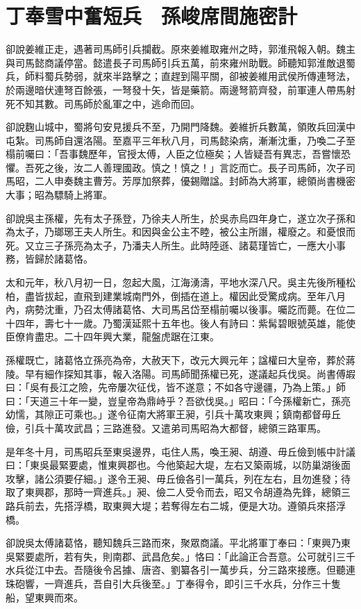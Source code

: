
\chapter{丁奉雪中奮短兵　孫峻席間施密計}

卻說姜維正走，遇著司馬師引兵攔截。原來姜維取雍州之時，郭淮飛報入朝。魏主與司馬懿商議停當。懿遣長子司馬師引兵五萬，前來雍州助戰。師聽知郭淮敵退蜀兵，師料蜀兵勢弱，就來半路擊之；直趕到陽平關，卻被姜維用武侯所傳連弩法，於兩邊暗伏連弩百餘張，一弩發十矢，皆是藥箭。兩邊弩箭齊發，前軍連人帶馬射死不知其數。司馬師於亂軍之中，逃命而回。

卻說麴山城中，蜀將句安見援兵不至，乃開門降魏。姜維折兵數萬，領敗兵回漢中屯紮。司馬師自還洛陽。至嘉平三年秋八月，司馬懿染病，漸漸沈重，乃喚二子至榻前囑曰：「吾事魏歷年，官授太傅，人臣之位極矣；人皆疑吾有異志，吾嘗懷恐懼。吾死之後，汝二人善理國政。慎之！慎之！」言訖而亡。長子司馬師，次子司馬昭，二人申奏魏主曹芳。芳厚加祭葬，優錫贈諡。封師為大將軍，總領尚書機密大事；昭為驃騎上將軍。

卻說吳主孫權，先有太子孫登，乃徐夫人所生，於吳赤烏四年身亡，遂立次子孫和為太子，乃瑯琊王夫人所生。和因與金公主不睦，被公主所譖，權廢之。和憂恨而死。又立三子孫亮為太子，乃潘夫人所生。此時陸遜、諸葛瑾皆亡，一應大小事務，皆歸於諸葛恪。

太和元年，秋八月初一日，忽起大風，江海湧濤，平地水深八尺。吳主先後所種松柏，盡皆拔起，直飛到建業城南門外，倒插在道上。權因此受驚成病。至年八月內，病勢沈重，乃召太傅諸葛恪、大司馬呂岱至榻前囑以後事。囑訖而薨。在位二十四年，壽七十一歲。乃蜀漢延熙十五年也。後人有詩曰：紫髯碧眼號英雄，能使臣僚肯盡忠。二十四年興大業，龍盤虎踞在江東。

孫權既亡，諸葛恪立孫亮為帝，大赦天下，改元大興元年；諡權曰大皇帝，葬於蔣陵。早有細作探知其事，報入洛陽。司馬師聞孫權已死，遂議起兵伐吳。尚書傅嘏曰：「吳有長江之險，先帝屢次征伐，皆不遂意；不如各守邊疆，乃為上策。」師曰：「天道三十年一變，豈皇帝為鼎峙乎？吾欲伐吳。」昭曰：「今孫權新亡，孫亮幼懦，其隙正可乘也。」遂令征南大將軍王昶，引兵十萬攻東興；鎮南都督毋丘儉，引兵十萬攻武昌；三路進發。又遣弟司馬昭為大都督，總領三路軍馬。

是年冬十月，司馬昭兵至東吳邊界，屯住人馬，喚王昶、胡遵、毋丘儉到帳中計議曰：「東吳最緊要處，惟東興郡也。今他築起大堤，左右又築兩城，以防巢湖後面攻擊，諸公須要仔細。」遂令王昶、毋丘儉各引一萬兵，列在左右，且勿進發；待取了東興郡，那時一齊進兵。」昶、儉二人受令而去，昭又令胡遵為先鋒，總領三路兵前去，先搭浮橋，取東興大堤；若奪得左右二城，便是大功。遵領兵來搭浮橋。

卻說吳太傅諸葛恪，聽知魏兵三路而來，聚眾商議。平北將軍丁奉曰：「東興乃東吳緊要處所，若有失，則南郡、武昌危矣。」恪曰：「此論正合吾意。公可就引三千水兵從江中去。吾隨後令呂據、唐咨、劉纂各引一萬步兵，分三路來接應。但聽連珠砲響，一齊進兵，吾自引大兵後至。」丁奉得令，即引三千水兵，分作三十隻船，望東興而來。

